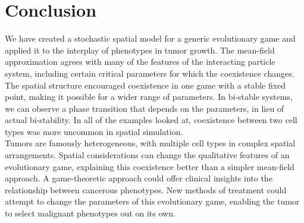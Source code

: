 \documentclass[12pt]{report}
\begin{document}
\chapter*{Conclusion}
We have created a stochastic spatial model for a generic evolutionary game and applied it to the interplay of phenotypes in tumor growth. The mean-field approximation agrees with many of the features of the interacting particle system, including certain critical parameters for which the coexistence changes. The spatial structure encouraged coexistence in one game with a stable fixed point, making it possible for a wider range of parameters. In bi-stable systems, we can observe a phase transition that depends on the parameters, in lieu of actual bi-stability. In all of the examples looked at, coexistence between two cell types was more uncommon in spatial simulation. \\

Tumors are famously heterogeneous, with multiple cell types in complex spatial arrangements. Spatial considerations can change the qualitative features of an evolutionary game, explaining this coexistence better than a simpler mean-field approach. A game-theoretic approach could offer clinical insights into the relationship between cancerous phenotypes. New methods of treatment could attempt to change the parameters of this evolutionary game, enabling the tumor to select malignant phenotypes out on its own.\\




\newpage 

\end{document}
